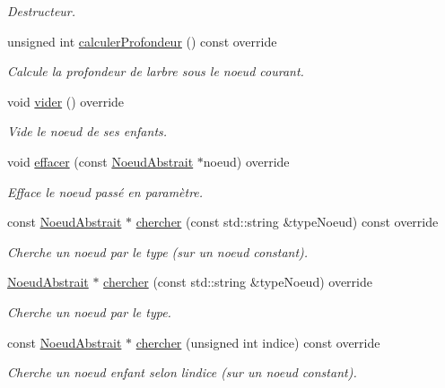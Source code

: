 \begin{DoxyCompactItemize}
\begin{DoxyCompactList}\small\item\em Destructeur. \end{DoxyCompactList}\item 
unsigned int \hyperlink{group__inf2990_gaf9a41e3632a6a321388c7705cfbece21}{calculer\+Profondeur} () const  override
\begin{DoxyCompactList}\small\item\em Calcule la profondeur de l\textquotesingle{}arbre sous le noeud courant. \end{DoxyCompactList}\item 
void \hyperlink{group__inf2990_gaede690fd0ecafe4244479ca4f054a65f}{vider} () override
\begin{DoxyCompactList}\small\item\em Vide le noeud de ses enfants. \end{DoxyCompactList}\item 
void \hyperlink{group__inf2990_gad6e967709392313acafee99a9a05a5a5}{effacer} (const \hyperlink{class_noeud_abstrait}{Noeud\+Abstrait} $\ast$noeud) override
\begin{DoxyCompactList}\small\item\em Efface le noeud passé en paramètre. \end{DoxyCompactList}\item 
const \hyperlink{class_noeud_abstrait}{Noeud\+Abstrait} $\ast$ \hyperlink{group__inf2990_ga10f285f39739539bbf9f8cb4b6383414}{chercher} (const std\+::string \&type\+Noeud) const  override
\begin{DoxyCompactList}\small\item\em Cherche un noeud par le type (sur un noeud constant). \end{DoxyCompactList}\item 
\hyperlink{class_noeud_abstrait}{Noeud\+Abstrait} $\ast$ \hyperlink{group__inf2990_gad7f54e2eb26b9ce59fbaedb2d0090f0e}{chercher} (const std\+::string \&type\+Noeud) override
\begin{DoxyCompactList}\small\item\em Cherche un noeud par le type. \end{DoxyCompactList}\item 
const \hyperlink{class_noeud_abstrait}{Noeud\+Abstrait} $\ast$ \hyperlink{group__inf2990_gaa522a1f30c1d045745ed04b680e2649b}{chercher} (unsigned int indice) const  override
\begin{DoxyCompactList}\small\item\em Cherche un noeud enfant selon l\textquotesingle{}indice (sur un noeud constant). \end{DoxyCompactList}\item 

\end{DoxyCompactItemize}
